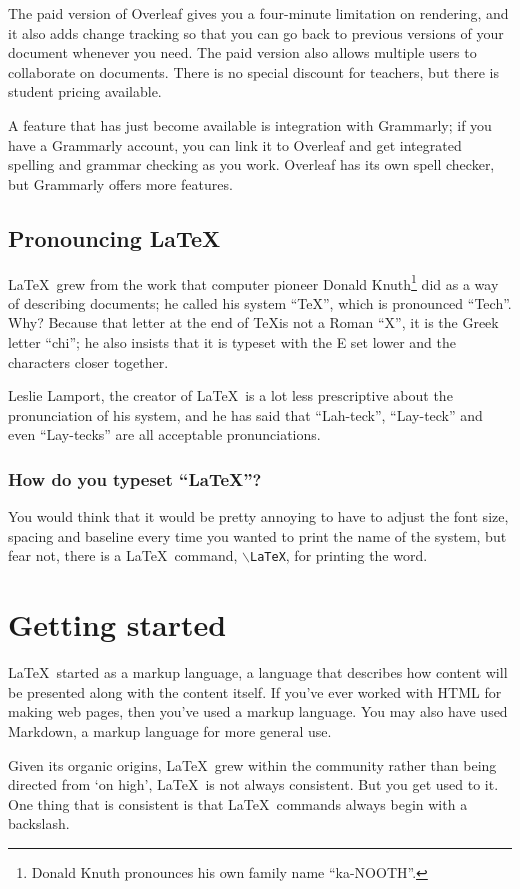 \documentclass[12pt]{extarticle}
\begin{document}
The paid version of Overleaf gives you a four-minute limitation on rendering, and it also adds change tracking so that you can go back to previous versions of your document whenever you need. The paid version also allows multiple users to collaborate on documents. There is no special discount for teachers, but there is student pricing available.

A feature that has just become available is integration with Grammarly; if you have a Grammarly account, you can link it to Overleaf and get integrated spelling and grammar checking as you work. Overleaf has its own spell checker, but Grammarly offers more features.
\subsection{Pronouncing \LaTeX}
\LaTeX\ grew from the work that computer pioneer Donald Knuth\footnote{Donald Knuth pronounces his own family name ``ka-NOOTH''.} did as a way of describing documents; he called his system ``\TeX'', which is pronounced ``Tech''. Why? Because that letter at the end of \TeX \space is not a Roman ``X'', it is the Greek letter ``chi''; he also insists that it is typeset with the E set lower and the characters closer together.

Leslie Lamport, the creator of \LaTeX\ is a lot less prescriptive about the pronunciation of his system, and he has said that ``Lah-teck'', ``Lay-teck'' and even ``Lay-tecks'' are all acceptable pronunciations.
\subsubsection{How do you typeset ``\LaTeX''?}
You would think that it would be pretty annoying to have to adjust the font size, spacing and baseline every time you wanted to print the name of the system, but fear not, there is a \LaTeX\ command, \texttt{$\backslash$LaTeX}, for printing the word.
\section{Getting started}
\LaTeX\ started as a markup language, a language that describes how content will be presented along with the content itself. If you've ever worked with HTML for making web pages, then you've used a markup language. You may also have used Markdown, a markup language for more general use.

Given its organic origins, \LaTeX\ grew within the community rather than being directed from `on high', \LaTeX\ is not always consistent. But you get used to it. One thing that is consistent is that \LaTeX\ commands always begin with a backslash.
\end{document}
